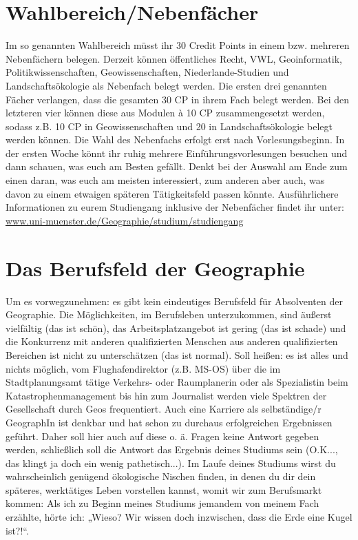 \section*{Wahlbereich/Nebenfächer}
Im so genannten Wahlbereich müsst ihr 30 Credit Points in einem bzw. mehreren Nebenfächern belegen. Derzeit können öffentliches Recht, VWL, Geoinformatik, Politikwissenschaften, Geowissenschaften, Niederlande-Studien und Landschaftsökologie als Nebenfach belegt werden. Die ersten drei genannten Fächer verlangen, dass die gesamten 30 CP in ihrem Fach belegt werden. Bei den letzteren vier können diese aus Modulen à 10 CP zusammengesetzt werden, sodass z.B. 10 CP in Geowissenschaften und 20 in Landschaftsökologie belegt werden können. Die Wahl des Nebenfachs erfolgt erst nach Vorlesungsbeginn. In der ersten Woche könnt ihr ruhig mehrere Einführungsvorlesungen besuchen und dann schauen, was euch am Besten gefällt. Denkt bei der Auswahl am Ende zum einen daran, was euch am meisten interessiert, zum anderen aber auch, was davon zu einem etwaigen späteren Tätigkeitsfeld passen könnte. Ausführlichere Informationen zu eurem Studiengang inklusive der Nebenfächer ﬁndet ihr unter: \url{www.uni-muenster.de/Geographie/studium/studiengang}

\section*{Das Berufsfeld der Geographie}
Um es vorwegzunehmen: es gibt kein eindeutiges Berufsfeld für Absolventen der Geographie. Die Möglichkeiten, im Berufsleben unterzukommen, sind äußerst vielfältig (das ist schön), das Arbeitsplatzangebot ist gering (das ist schade) und die Konkurrenz mit anderen qualifizierten Menschen aus anderen qualifizierten Bereichen ist nicht zu unterschätzen (das ist normal). Soll heißen: es ist alles und nichts möglich, vom Flughafendirektor (z.B. MS-OS) über die im Stadtplanungsamt tätige Verkehrs- oder Raumplanerin oder als Spezialistin beim Katastrophenmanagement bis hin zum Journalist werden viele Spektren der Gesellschaft durch Geos frequentiert. Auch eine Karriere als selbständige/r GeographIn ist denkbar und hat schon zu durchaus erfolgreichen Ergebnissen geführt. Daher soll hier auch auf diese o. ä. Fragen keine Antwort gegeben werden, schließlich soll die Antwort das Ergebnis deines Studiums sein (O.K..., das klingt ja doch ein wenig pathetisch...). Im Laufe deines Studiums wirst du wahrscheinlich genügend ökologische Nischen ﬁnden, in denen du dir dein späteres, werktätiges Leben vorstellen kannst, womit wir zum Berufsmarkt kommen: Als ich zu Beginn meines Studiums jemandem von meinem Fach erzählte, hörte ich: „Wieso? Wir wissen doch inzwischen, dass die Erde eine Kugel ist?!“.

